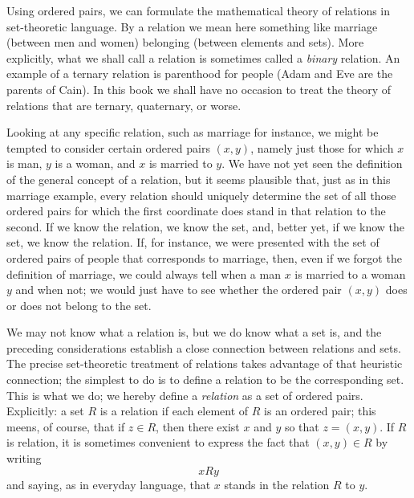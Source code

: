 
Using ordered pairs, we can formulate the mathematical theory of relations in set-theoretic language. By a relation we mean here something like marriage (between men and women) belonging (between elements and sets).  More explicitly, what we shall call a relation is sometimes called a \textit{binary} relation. An example of a ternary relation is parenthood for people (Adam and Eve are the parents of Cain). In this book we shall have no occasion to treat the theory of relations that are ternary, quaternary, or worse. 

Looking at any specific relation, such as marriage for instance, we might be tempted to consider certain ordered pairs $(x,y)$, namely just those for which $x$ is man, $y$ is a woman, and $x$ is married to $y$. We have not yet seen the definition of the general concept of a relation, but it seems plausible that, just as in this marriage example, every relation should uniquely determine the set of all those ordered pairs for which the first coordinate does stand in that relation to the second. If we know the relation, we know the set, and, better yet, if we know the set, we know the relation. If, for instance, we were presented with the set of ordered pairs of people that corresponds to marriage, then, even if we forgot the definition of marriage, we could always tell when a man $x$ is married to a woman $y$ and when not; we would just have to see whether the ordered pair $(x,y)$ does or does not belong to the set.

We may not know what a relation is, but we do know what a set is, and the preceding considerations establish a close connection between relations and sets. The precise set-theoretic treatment of relations takes advantage of that heuristic connection; the simplest to do is to define a relation to be the corresponding set. This is what we do; we hereby define a \textit{relation} as a set of ordered pairs. Explicitly: a set $R$ is a relation if each element of $R $ is an ordered pair; this meens, of course, that if $z \in R $, then there exist $x$ and $y$ so that $z = (x,y)$. If $R $ is relation, it is sometimes convenient to express the fact that $(x, y) \in R $ by writing 
\begin{equation*}
x R y
\end{equation*}
and saying, as in everyday language, that $x$ stands in the relation $R $ to $y$. 

